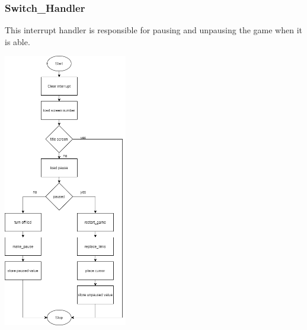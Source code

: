 \documentclass{article}
\begin{document}
    \subsubsection{Switch\_Handler}
        This interrupt handler is responsible for pausing and unpausing
        the game when it is able.
        \begin{center}
            {\includegraphics[height=12cm]{Switch_Handler.png}\centering} 
        \end{center}
        \newpage   
\end{document}
